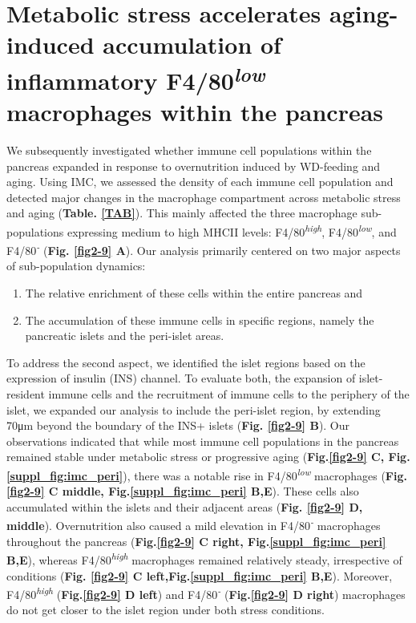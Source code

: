 \clearpage

\section{Metabolic stress accelerates aging-induced accumulation of\\inflammatory F4/80\textsuperscript{\textit{low}} macrophages within the pancreas}
\label{sec:imc_acceleration}

We subsequently investigated whether immune cell populations within the pancreas expanded in response to overnutrition induced by WD-feeding and aging. Using IMC, we assessed the density of each immune cell population and detected major changes in the macrophage compartment across metabolic stress and aging (\textbf{Table. \ref{TAB}}). This mainly affected the three macrophage sub-populations expressing medium to high MHCII levels: F4/80\textsuperscript{\textit{high}}, F4/80\textsuperscript{\textit{low}}, and F4/80\textsuperscript{\textit{-}} (\textbf{Fig. \ref{fig2-9} A}). Our analysis primarily centered on two major aspects of sub-population dynamics: 
\begin{enumerate}
    \item The relative enrichment of these cells within the entire pancreas and
    \item The accumulation of these immune cells in specific regions, namely the pancreatic islets and the peri-islet areas.
\end{enumerate}

To address the second aspect, we identified the islet regions based on the expression of insulin (INS) channel. To evaluate both, the expansion of islet-resident immune cells and the recruitment of immune cells to the periphery of the islet, we expanded our analysis to include the peri-islet region, by extending 70μm beyond the boundary of the INS+ islets (\textbf{Fig. \ref{fig2-9} B}). Our observations indicated that while most immune cell populations in the pancreas remained stable under metabolic stress or progressive aging (\textbf{Fig.\ref{fig2-9} C, Fig.\ref{suppl_fig:imc_peri}}), there was a notable rise in F4/80\textsuperscript{\textit{low}} macrophages (\textbf{Fig. \ref{fig2-9} C middle, Fig.\ref{suppl_fig:imc_peri} B,E}). These cells also accumulated within the islets and their adjacent areas (\textbf{Fig. \ref{fig2-9} D, middle}). Overnutrition also caused a mild elevation in F4/80\textsuperscript{\textit{-}} macrophages throughout the pancreas (\textbf{Fig.\ref{fig2-9} C right, Fig.\ref{suppl_fig:imc_peri} B,E}), whereas F4/80\textsuperscript{\textit{high}} macrophages remained relatively steady, irrespective of conditions (\textbf{Fig. \ref{fig2-9} C left,Fig.\ref{suppl_fig:imc_peri} B,E}). Moreover, F4/80\textsuperscript{\textit{high}} (\textbf{Fig.\ref{fig2-9} D left})  and F4/80\textsuperscript{\textit{-}} (\textbf{Fig.\ref{fig2-9} D right}) macrophages do not get closer to the islet region under both stress conditions.
\clearpage

